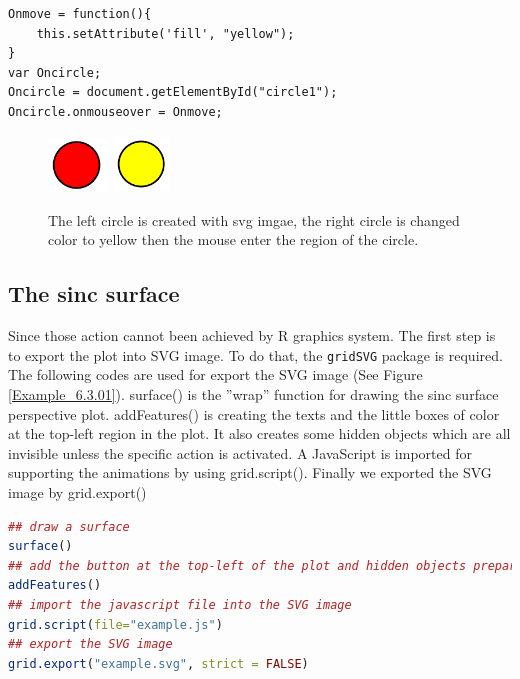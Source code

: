 \documentclass[paper=a4, fontsize=11pt]{report}
\begin{document}
\begin{lstlisting}
Onmove = function(){
    this.setAttribute('fill', "yellow");
}
var Oncircle;
Oncircle = document.getElementById("circle1");
Oncircle.onmouseover = Onmove;
\end{lstlisting}

\begin{figure}[h]
	\begin{center}
		\includegraphics[height = 1.45cm, width = 1.6cm]{figure/svg/svgdemo0.PNG}
		\hspace{4cm}
		\includegraphics[height = 1.5cm, width = 1.5cm]{figure/svg/svgdemo1.PNG}
		\caption{The left circle is created with svg imgae, the right circle is changed color to yellow then the mouse enter the region of the circle. }
		\label{Example_6.3.0}
	\end{center}
\end{figure}

\subsection{The sinc surface}
Since those action cannot been achieved by R graphics system. The first step is to export the plot into
SVG image. To do that, the \texttt{gridSVG} package is required. The following codes are used for export the SVG image (See Figure \ref{Example_6.3.01}). surface() is the ''wrap'' function for drawing the sinc surface perspective plot.
addFeatures() is creating the texts and the little boxes of color at the top-left region in the plot.
It also creates some hidden objects which are all invisible unless the specific action is activated. A
JavaScript is imported for supporting the animations by using grid.script(). Finally we exported
the SVG image by grid.export()
\\

\begin{lstlisting}[language = R]
## draw a surface
surface()  
## add the button at the top-left of the plot and hidden objects prepare for animation
addFeatures() 
## import the javascript file into the SVG image
grid.script(file="example.js") 
## export the SVG image
grid.export("example.svg", strict = FALSE) 
\end{lstlisting}
\end{document}
